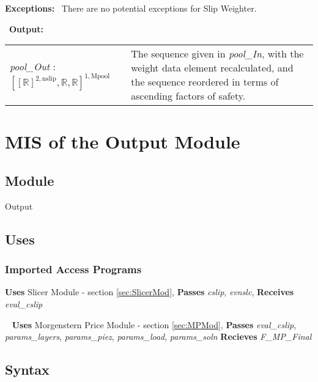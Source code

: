 \documentclass[12pt, titlepage]{article}
\begin{document}
\noindent \textbf{Exceptions:} ~\newline\noindent There are no
potential exceptions for Slip Weighter.

~\newline\noindent \textbf{Output:}
\renewcommand*{\arraystretch}{1.5}
\begin{longtable}{p{} p{}}
  \textit{pool\_Out} : $[[\mathbb{R}]^{2,\text{nslip}}, \mathbb{R},
    \mathbb{R}]^{1,\text{Mpool}}$ & The sequence given in
  \textit{pool\_In}, with the weight data element recalculated, and
  the sequence reordered in terms of ascending factors of safety. \\
\end{longtable}



\section{MIS of the Output
  Module} \label{sec:OutputMod}

\subsection{Module}
Output

\subsection{Uses}

\subsubsection{Imported Access Programs}
\textbf{Uses} Slicer Module - section \ref{sec:SlicerMod},
\textbf{Passes} \textit{cslip}, \textit{evnslc}, \textbf{Receives}
\textit{eval\_cslip}

~\newline\noindent
\textbf{Uses} Morgenstern Price Module - section \ref{sec:MPMod},
\textbf{Passes} \textit{eval\_cslip}, \textit{params\_layers},
\textit{params\_piez}, \textit{params\_load},
\textit{params\_soln} \textbf{Recieves} \textit{F\_MP\_Final}

\subsection{Syntax}
\end{document}
